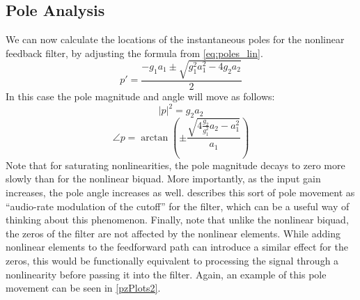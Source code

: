\documentclass[twoside,a4paper]{article}
\begin{document}
\subsection{Pole Analysis}
%
We can now calculate the locations of the instantaneous poles for
the nonlinear feedback filter, by adjusting the formula from
\cref{eq:poles_lin}.
%
\begin{equation}
p' = \frac{-g_1 a_1 \pm \sqrt{g_1^2 a_1^2 - 4 g_2 a_2}}{2}
    \label{eq:poles_nl2}
\end{equation}
%
In this case the pole magnitude and angle will move as follows:
\begin{equation}
    |p|^2 = g_2a_2
    \label{eq:poles_nl2_mag}
\end{equation}
%
\begin{equation}
    \angle p = \arctan \left( \pm \frac{\sqrt{4\frac{g_2}{g_1^2}a_2 - a_1^2}}{a_1} \right)
    \label{eq:poles_nl2_angle}
\end{equation}
%
Note that for saturating nonlinearities, the pole magnitude decays to
zero more slowly than for the
nonlinear biquad. More importantly, as the input gain increases,
the pole angle increases as well. \cite{Vadim} describes this sort of
pole movement as ``audio-rate modulation of the cutoff'' for the
filter, which can be a useful way of thinking about this phenomenon.
\newline\newline
Finally, note that unlike the nonlinear biquad, the zeros of the
filter are not affected by the nonlinear elements.
While adding nonlinear elements to the feedforward path can introduce 
a similar effect for the zeros, this would be
functionally equivalent to processing the signal through a nonlinearity
before passing it into the filter. Again, an example of this pole movement
can be seen in \cref{pzPlots2}.
%
\end{document}
